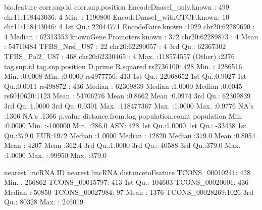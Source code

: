 \documentclass[12pt,fullpage]{article}
\begin{document}
\begin{Schunk}
\begin{Soutput}
                      bio.feature            corr.snp.id   corr.snp.position  
 EncodeDnaseI_only.known    : 499   chr11:118443036:   4   Min.   :  1190800  
 EncodeDnaseI_withCTCF.known:  10   chr11:118443046:   4   1st Qu.: 22044771  
 EncodeFaire.known          :1029   chr20:62289690 :   4   Median : 62313353  
 knownGene.Promoters.known  : 372   chr20:62289873 :   4   Mean   : 54710484  
 TFBS_Nrsf_U87              :  22   chr20:62290057 :   4   3rd Qu.: 62367302  
 TFBS_Pol2_U87              : 468   chr20:62330465 :   4   Max.   :118574557  
                                    (Other)        :2376                      
     tag.snp.id   tag.snp.position       D.prime         R.squared     
 rs2736100: 428   Min.   :  1286516   Min.   :0.0008   Min.   :0.0000  
 rs4977756: 413   1st Qu.: 22068652   1st Qu.:0.9027   1st Qu.:0.0011  
 rs498872 : 436   Median : 62309839   Median :1.0000   Median :0.0045  
 rs6010620:1123   Mean   : 54706276   Mean   :0.8662   Mean   :0.0974  
                  3rd Qu.: 62309839   3rd Qu.:1.0000   3rd Qu.:0.0301  
                  Max.   :118477367   Max.   :1.0000   Max.   :0.9776  
                                      NA's   :1366     NA's   :1366    
    p.value       distance.from.tag population.count population
 Min.   :0.0000   Min.   :-100000   Min.   :286.0    ASN: 428  
 1st Qu.:1.0000   1st Qu.: -33438   1st Qu.:379.0    EUR:1972  
 Median :1.0000   Median :  12820   Median :379.0              
 Mean   :0.8054   Mean   :   4207   Mean   :362.4              
 3rd Qu.:1.0000   3rd Qu.:  40588   3rd Qu.:379.0              
 Max.   :1.0000   Max.   :  99950   Max.   :379.0              
                                                               
      nearest.lincRNA.ID nearest.lincRNA.distancetoFeature
 TCONS_00010241: 428     Min.   :-266862                  
 TCONS_00015797: 413     1st Qu.:-104603                  
 TCONS_00020001: 436     Median :  50850                  
 TCONS_00027984:  97     Mean   :   1376                  
 TCONS_00028269:1026     3rd Qu.:  80328                  
                         Max.   : 246019                  
                                                          

\end{Soutput}
\end{Schunk}
\end{document}
